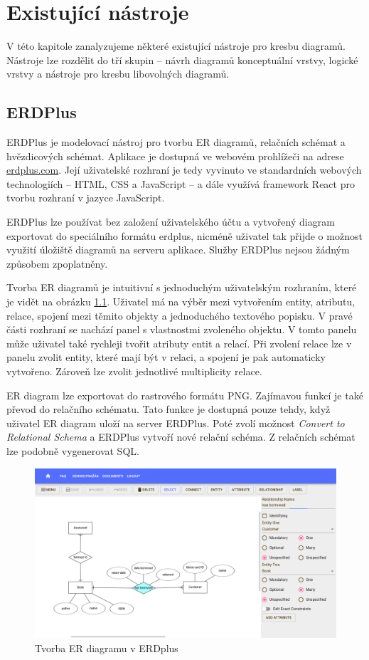\chapter{Existující nástroje}

V této kapitole zanalyzujeme některé existující nástroje pro kresbu diagramů.
Nástroje lze rozdělit do tří skupin -- návrh diagramů konceptuální vrstvy,
logické vrstvy a nástroje pro kresbu libovolných diagramů.

\section{ERDPlus}

ERDPlus je modelovací nástroj pro tvorbu ER diagramů, relačních schémat a
hvězdicových schémat. Aplikace je dostupná ve webovém prohlížeči na adrese
\url{erdplus.com}. Její uživatelské rozhraní je tedy vyvinuto ve standardních
webových technologiích -- HTML, CSS a JavaScript -- a dále využívá framework
React pro tvorbu rozhraní v jazyce JavaScript.

ERDPlus lze používat bez založení uživatelského účtu a vytvořený diagram
exportovat do speciálního formátu erdplus, nicméně uživatel tak přijde o možnost
využití úložiště diagramů na serveru aplikace. Služby ERDPlus nejsou žádným
způsobem zpoplatněny.

Tvorba ER diagramů je intuitivní s jednoduchým uživatelským rozhraním, které je
vidět na obrázku \ref{fig:erdplus}. Uživatel má na výběr mezi vytvořením entity,
atributu, relace, spojení mezi těmito objekty a jednoduchého textového popisku.
V pravé části rozhraní se nachází panel s vlastnostmi zvoleného objektu. V tomto
panelu může uživatel také rychleji tvořit atributy entit a relací. Při zvolení
relace lze v panelu zvolit entity, které mají být v relaci, a spojení je pak
automaticky vytvořeno. Zároveň lze zvolit jednotlivé multiplicity relace.

ER diagram lze exportovat do rastrového formátu PNG. Zajímavou funkcí je také
převod do relačního schématu. Tato funkce je dostupná pouze tehdy, když uživatel
ER diagram uloží na server ERDPlus. Poté zvolí možnost \emph{Convert to
Relational Schema} a ERDPlus vytvoří nové relační schéma. Z relačních schémat
lze podobně vygenerovat SQL.

\begin{figure}
  \centering
  \includegraphics[width=\textwidth]{../img/erdplus.png}
  \caption{Tvorba ER diagramu v ERDplus}
  \label{fig:erdplus}
\end{figure}


